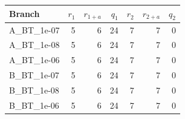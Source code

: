 \begin{tabular}{lrrrrrr}
\toprule
Branch & $r_1$ & $r_{1+a}$ & $q_1$ & $r_2$ & $r_{2+a}$ & $q_2$ \\
\midrule
A\_BT\_1e-07 & 5 & 6 & 24 & 7 & 7 & 0 \\
A\_BT\_1e-08 & 5 & 6 & 24 & 7 & 7 & 0 \\
A\_BT\_1e-06 & 5 & 6 & 24 & 7 & 7 & 0 \\
B\_BT\_1e-07 & 5 & 6 & 24 & 7 & 7 & 0 \\
B\_BT\_1e-08 & 5 & 6 & 24 & 7 & 7 & 0 \\
B\_BT\_1e-06 & 5 & 6 & 24 & 7 & 7 & 0 \\
\bottomrule
\end{tabular}
